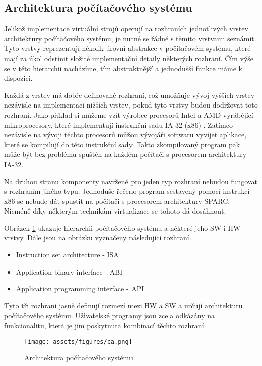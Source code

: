   \subsection{Architektura počítačového systému}
  \label{subsection:computer_architecture}
  
  Jelikož implementace virtuální strojů operují na rozhraních jednotlivých vrstev architektury počítačového systému, je nutné se řádně s těmito vrstvami seznámit. Tyto vrstvy reprezentují několik úrovní abstrakce v
  počítačovém systému, které mají za úkol odstínit složité implementační detaily některých rozhraní. Čím výše se v této hierarchii nacházíme, tím abstraktnější a jednodušší funkce máme k dispozici.
  
  Každá z vrstev má dobře definované rozhraní, což umožňuje vývoj vyšších vrstev nezávisle na implementaci nižších vrstev, pokud tyto vrstvy budou dodržovat toto rozhraní. Jako příklad si můžeme vzít výrobce procesorů
  Intel a AMD vyrábějící mikroprocesory, které implementují instrukční sadu IA-32 (x86) \cite{book:iee:vm_architecture}. Zatímco nezávisle na vývoji těchto procesorů můžou vývojáři softwaru vyvíjet aplikace, které
  se kompilují do této instrukční sady. Takto zkompilovaný program pak může být bez problému spuštěn na každém počítači s procesorem architektury IA-32.
  
  Na druhou stranu komponenty navržené pro jeden typ rozhraní nebudou fungovat s rozhraním jiného typu. Jednoduše řečeno program sestavený pomocí instrukcí x86 se nebude dát spustit na počítači s procesorem architektury
  SPARC. Nicméně díky některým technikám virtualizace se tohoto dá dosáhnout. 
  
  Obrázek \ref{figure:computer_architecture} ukazuje hierarchii počítačového systému a některé jeho SW i HW vrstvy. Dále jsou na obrázku vyznačeny následující rozhraní.
  
  \begin{itemize}
   \item Instruction set architecture - ISA
   \item Application binary interface - ABI
   \item Application programming interface - API
  \end{itemize}

  Tyto tři rozhraní jasně definují rozmezí mezi HW a SW a určují architekturu počítačového systému. Uživatelské programy jsou zcela odkázány na funkcionalitu, která je jim poskytnuta kombinací těchto rozhraní.

    \begin{figure}
      \centering
      \texttt{[image: assets/figures/ca.png]}
      \caption[Architektura počítačového systému]{Architektura počítačového systému \cite{book:iee:vm_architecture}}
      \label{figure:computer_architecture}
    \end{figure}


